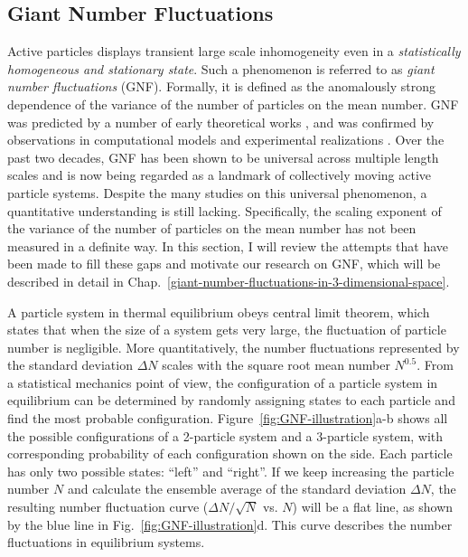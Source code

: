 \subsection{Giant Number Fluctuations}
\label{sec:intro-GNF}
Active particles displays transient large scale inhomogeneity even in a \textit{statistically homogeneous and stationary state}.
Such a phenomenon is referred to as \textit{giant number fluctuations} (GNF). Formally, it is defined as the anomalously strong dependence of the variance of the number of particles on the mean number.
GNF was predicted by a number of early theoretical works \cite{Toner1995, Toner1998,
Tu1998, Simha2002, Ramaswamy2003, Saintillan2008a, Saintillan2008b, Ramaswamy2010}, and was confirmed by observations in computational models
\cite{Mishra2006, Chate2008, Dey2012, Saintillan2012, Ngo2014, Mahault2019} and experimental realizations
\cite{Narayan2007, Aranson2008, Zhang2010, Deseigne2010, Schaller2013, Palacci2013,
Kawaguchi2017, Nishiguchi2017, Karani2019}. Over the past two decades, GNF has been shown to be universal across multiple length scales and is now being regarded as a landmark of collectively moving active particle systems. Despite the many studies on this universal phenomenon, a quantitative understanding is still lacking. Specifically, the scaling exponent of the variance of the number of particles on the mean number has not been measured in a definite way. In this section, I will review the attempts that have been made to fill these gaps and motivate our research on GNF, which will be described in detail in Chap.~\ref{giant-number-fluctuations-in-3-dimensional-space}.

A particle system in thermal equilibrium obeys central limit theorem, which states that when the size of a system gets very large, the fluctuation of particle number is negligible. More quantitatively, the number fluctuations represented by the standard deviation $\Delta N$ scales with the square root mean number $N^{0.5}$. From a statistical mechanics point of view, the configuration of a particle system in equilibrium can be determined by randomly assigning states to each particle and find the most probable configuration. Figure~\ref{fig:GNF-illustration}a-b shows all the possible configurations of a 2-particle system and a 3-particle system, with corresponding probability of each configuration shown on the side. Each particle has only two possible states: ``left'' and ``right''. If we keep increasing the particle number $N$ and calculate the ensemble average of the standard deviation $\Delta N$, the resulting number fluctuation curve ($\Delta N/\sqrt N$ vs. $N$) will be a flat line, as shown by the blue line in Fig.~\ref{fig:GNF-illustration}d. This curve describes the number fluctuations in equilibrium systems.

